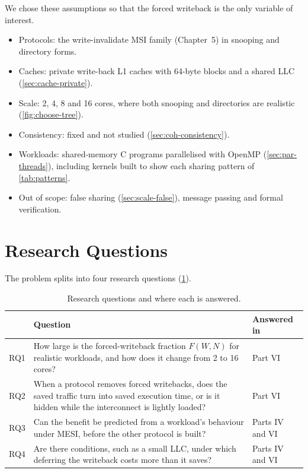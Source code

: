 We chose these assumptions so that the forced writeback is the only variable of
interest.
\begin{itemize}[itemsep=1pt]
  \item Protocols: the write-invalidate MSI family (Chapter~5) in snooping and
    directory forms.
  \item Caches: private write-back L1 caches with 64-byte blocks and a shared LLC
    (\cref{sec:cache-private}).
  \item Scale: 2, 4, 8 and 16 cores, where both snooping and directories are
    realistic (\cref{fig:choose-tree}).
  \item Consistency: fixed and not studied (\cref{sec:coh-consistency}).
  \item Workloads: shared-memory C programs parallelised with OpenMP
    (\cref{sec:par-threads}), including kernels built to show each sharing pattern
    of \cref{tab:patterns}.
  \item Out of scope: false sharing (\cref{sec:scale-false}), message passing and
    formal verification.
\end{itemize}

\section{Research Questions}
\label{sec:prob-rq}

The problem splits into four research questions (\cref{tab:rq}).

\begin{table}[htbp]
\centering
\caption{Research questions and where each is answered.}
\label{tab:rq}
\small
\begin{tabular}{@{}l p{8.4cm} l@{}}
\toprule
 & Question & Answered in \\
\midrule
RQ1 & How large is the forced-writeback fraction $F(W,N)$ for realistic
  workloads, and how does it change from 2 to 16 cores? & Part VI \\
RQ2 & When a protocol removes forced writebacks, does the saved traffic turn
  into saved execution time, or is it hidden while the interconnect is lightly
  loaded? & Part VI \\
RQ3 & Can the benefit be predicted from a workload's behaviour under MESI,
  before the other protocol is built? & Parts IV and VI \\
RQ4 & Are there conditions, such as a small LLC, under which deferring the
  writeback costs more than it saves? & Parts IV and VI \\
\bottomrule
\end{tabular}
\end{table}

